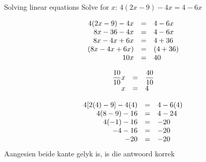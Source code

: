 \begin{wex}
{Solving linear equations }
{Solve for $x$: $4(2x-9)-4x=4-6x$}
{

\begin{equation*}
    \begin{array}{ccl}\hfill 4(2x-9)-4x& =& 4-6x\hfill  \\ 
	\hfill 8x-36-4x& =& 4-6x\hfill   \\ 
	\hfill 8x-4x+6x& =& 4+36\hfill  \\ 
	\hfill (8x-4x+6x)& =& (4+36)\hfill   \\   
	\hfill 10x& =& 40\hfill  
    \end{array}
\end{equation*}

\begin{equation*}
    \begin{array}{ccl}
	\hfill \dfrac{10}{10}x& =& \dfrac{40}{10}\hfill\\
	\hfill x& =& 4\hfill  
    \end{array}
\end{equation*}


\begin{equation*}
    \begin{array}{ccl}\hfill 4[2(4)-9]-4(4)& =& 4-6(4)\hfill \\
	\hfill 4(8-9)-16& =& 4-24\hfill \\
	\hfill 4(-1)-16& =& -20\hfill \\
	\hfill -4-16& =& -20\hfill \\
	\hfill -20& =& -20\hfill 
    \end{array}
\end{equation*}
Aangesien beide kante gelyk is, is die antwoord korrek 
}
\end{wex}

